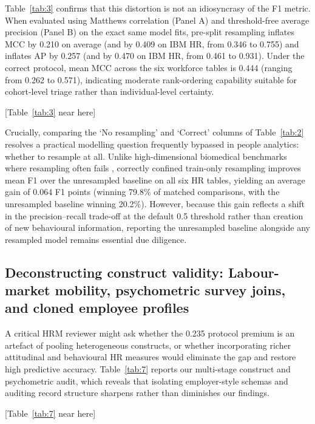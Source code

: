 \documentclass[12pt,a4paper]{article}
\begin{document}
Table~\ref{tab:3} confirms that this distortion is not an idiosyncrasy of the F1 metric. When evaluated using Matthews correlation (Panel A) and threshold-free average precision (Panel B) on the exact same model fits, pre-split resampling inflates MCC by 0.210 on average (and by 0.409 on IBM HR, from 0.346 to 0.755) and inflates AP by 0.257 (and by 0.470 on IBM HR, from 0.461 to 0.931). Under the correct protocol, mean MCC across the six workforce tables is 0.444 (ranging from 0.262 to 0.571), indicating moderate rank-ordering capability suitable for cohort-level triage rather than individual-level certainty.

\begin{center}
[Table~\ref{tab:3} near here]
\end{center}

Crucially, comparing the `No resampling' and `Correct' columns of Table~\ref{tab:2} resolves a practical modelling question frequently bypassed in people analytics: whether to resample at all. Unlike high-dimensional biomedical benchmarks where resampling often fails \parencite{ref8}, correctly confined train-only resampling improves mean F1 over the unresampled baseline on all six HR tables, yielding an average gain of 0.064 F1 points (winning 79.8\% of matched comparisons, with the unresampled baseline winning 20.2\%). However, because this gain reflects a shift in the precision--recall trade-off at the default 0.5 threshold rather than creation of new behavioural information, reporting the unresampled baseline alongside any resampled model remains essential due diligence.

\subsection{Deconstructing construct validity: Labour-market mobility, psychometric survey joins, and cloned employee profiles}
\label{sec:construct-results}
A critical HRM reviewer might ask whether the 0.235 protocol premium is an artefact of pooling heterogeneous constructs, or whether incorporating richer attitudinal and behavioural HR measures would eliminate the gap and restore high predictive accuracy. Table~\ref{tab:7} reports our multi-stage construct and psychometric audit, which reveals that isolating employer-style schemas and auditing record structure sharpens rather than diminishes our findings.

\begin{center}
[Table~\ref{tab:7} near here]
\end{center}
\end{document}
